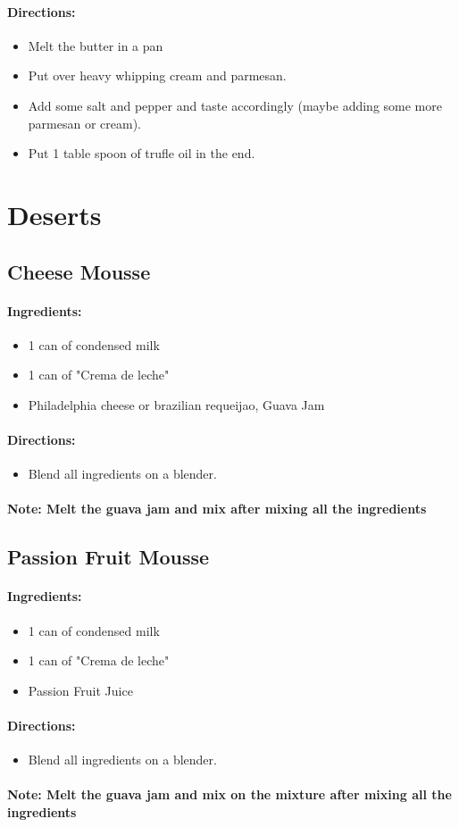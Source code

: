 \documentclass{article}
\begin{document}
\paragraph{Directions:}
\begin{itemize}
	\item Melt the butter in a pan
	\item Put over heavy whipping cream and parmesan.
	\item Add some salt and pepper and taste accordingly (maybe adding some more parmesan or cream).
	\item Put 1 table spoon of trufle oil in the end. 
\end{itemize}

\section{Deserts}

\newcommand{\mousse}[3]{
\subsection{#1 Mousse}

\paragraph{Ingredients:}

\begin{itemize}
	\item 1 can of condensed milk
	\item 1 can of "Crema de leche"
	\item #2
\end{itemize}

\paragraph{Directions:}
\begin{itemize}
	\item Blend all ingredients on a blender.
\end{itemize}

\paragraph{Note: #3}
}

\mousse{Cheese}{Philadelphia cheese or brazilian requeijao, Guava Jam}{Melt the guava jam and mix after mixing all the ingredients}

\mousse{Passion Fruit}{Passion Fruit Juice}{Melt the guava jam and mix on the mixture after mixing all the ingredients}
\end{document}
